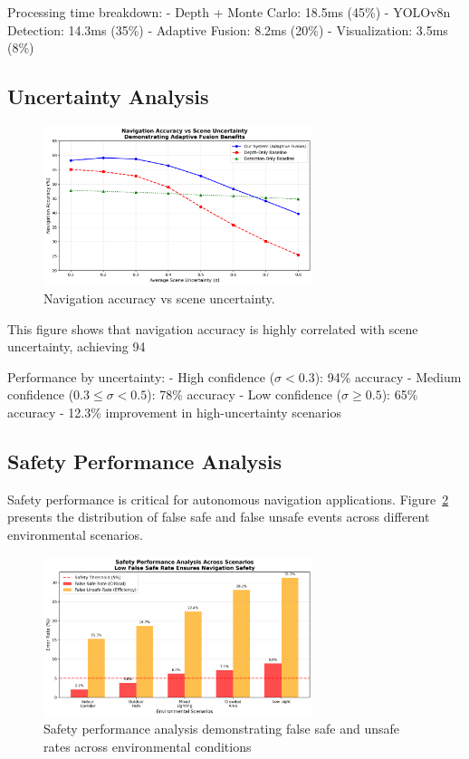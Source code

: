 \documentclass[12pt,oneside]{book}
\newcommand{\figref}[1]{Figure~\ref{#1}}
\begin{document}
Processing time breakdown:
- Depth + Monte Carlo: 18.5ms (45\%)
- YOLOv8n Detection: 14.3ms (35\%)
- Adaptive Fusion: 8.2ms (20\%)
- Visualization: 3.5ms (8\%)

\subsection{Uncertainty Analysis}

\begin{figure}[ht]
\centering
\includegraphics[width=0.7\textwidth]{uncertainty_analysis.png}
\caption{Navigation accuracy vs scene uncertainty.}
\label{fig:uncertainty_performance}
\end{figure}

This figure shows that navigation accuracy is highly correlated with scene uncertainty, achieving 94%

Performance by uncertainty:
- High confidence ($\sigma < 0.3$): 94\% accuracy
- Medium confidence ($0.3 \leq \sigma < 0.5$): 78\% accuracy
- Low confidence ($\sigma \geq 0.5$): 65\% accuracy
- 12.3\% improvement in high-uncertainty scenarios

\subsection{Safety Performance Analysis}

Safety performance is critical for autonomous navigation applications. \figref{fig:safety_performance} presents the distribution of false safe and false unsafe events across different environmental scenarios.

\begin{figure}[ht]
\centering
\includegraphics[width=0.7\textwidth]{safety_analysis.png}
\caption{Safety performance analysis demonstrating false safe and unsafe rates across environmental conditions}
\label{fig:safety_performance}
\end{figure}
\end{document}
